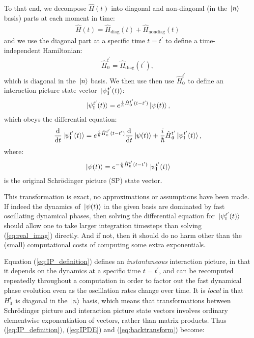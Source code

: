 To that end, we decompose $\hat H(t)$ into diagonal and non-diagonal (in the $\ket{n}$ basis) parts at each moment in time:
\begin{align}
\hat H(t) = \hat H_{\mathrm{diag}}(t) + \hat H_{\mathrm{nondiag}}(t)
\end{align}
and we use the diagonal part at a specific time $t=t^\prime$ to define a time-independent Hamiltonian:
\begin{align}\label{eq:H0def}
 \hat H_0^{t^\prime} = \hat H_{\mathrm{diag}}(t^\prime),
\end{align}
which is diagonal in the $\ket{n}$ basis. We then use then use $\hat H_0^{t^\prime}$ to define an interaction picture state vector $\ket{\psi_{\mathrm{I}}^{t^\prime}(t)}$:
\begin{align}\label{eq:IP_definition}
\ket{\psi_{\mathrm{I}}^{t^\prime}(t)} = e^{\frac i \hbar \hat H_0^{t^\prime}(t - t^\prime)}\ket{\psi(t)},
\end{align}
which obeys the differential equation:
\begin{align}\label{eq:IPDE}
\dv t \ket{\psi_{\mathrm{I}}^{t^\prime}(t)}
    = e^{\frac i \hbar \hat H_0^{t^\prime}(t - t^\prime)}\dv t \ket{\psi(t)}
      + \frac i\hbar \hat H_0^{t^\prime}\ket{\psi_{\mathrm{I}}^{t^\prime}(t)},
\end{align}
where:
\begin{align}\label{eq:backtransform}
\ket{\psi(t)} = e^{-\frac i \hbar \hat H_0^{t^\prime}(t - t^\prime)}\ket{\psi_{\mathrm{I}}^{t^\prime}(t)}
\end{align}
is the original Schrödinger picture (SP) state vector.

This transformation is exact, no approximations or assumptions have been made. If indeed the dynamics of $\ket{\psi(t)}$ in the given basis are dominated by fast oscillating dynamical phases, then solving the differential equation for $\ket{\psi_{\mathrm{I}}^{t^\prime}(t)}$ should allow one to take larger integration timesteps than solving (\ref{eq:real_imag}) directly. And if not, then it should do no harm other than the (small) computational costs of computing some extra exponentials.

Equation (\ref{eq:IP_definition}) defines an \emph{instantaneous} interaction picture, in that it depends on the dynamics at a specific time $t=t^\prime$, and can be recomputed repeatedly throughout a computation in order to factor out the fast dynamical phase evolution even as the oscillation rates change over time. It is \emph{local} in that $H_0^{t^\prime}$ is diagonal in the $\ket{n}$ basis, which means that transformations between Schrödinger picture and interaction picture state vectors involves ordinary elementwise exponentiation of vectors, rather than matrix products. Thus (\ref{eq:IP_definition}), (\ref{eq:IPDE}) and (\ref{eq:backtransform}) become:


